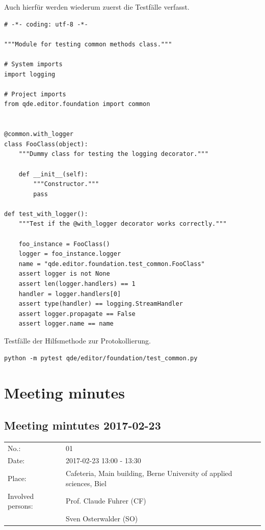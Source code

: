\documentclass[10pt, openright, notitlepage]{scrreprt}
\begin{document}
Auch hierfür werden wiederum zuerst die Testfälle verfasst.

\begin{listing}[H]
\begin{verbatim}
# -*- coding: utf-8 -*-

"""Module for testing common methods class."""

# System imports
import logging

# Project imports
from qde.editor.foundation import common


@common.with_logger
class FooClass(object):
    """Dummy class for testing the logging decorator."""

    def __init__(self):
        """Constructor."""
        pass

def test_with_logger():
    """Test if the @with_logger decorator works correctly."""

    foo_instance = FooClass()
    logger = foo_instance.logger
    name = "qde.editor.foundation.test_common.FooClass"
    assert logger is not None
    assert len(logger.handlers) == 1
    handler = logger.handlers[0]
    assert type(handler) == logging.StreamHandler
    assert logger.propagate == False
    assert logger.name == name
\end{verbatim}
\caption{\label{fig:editor-common-logging-test}
Testfälle der Hilfsmethode zur Protokollierung.}
\end{listing}

\begin{verbatim}
python -m pytest qde/editor/foundation/test_common.py
\end{verbatim}


\section{Meeting minutes}
\label{sec:org53120a9}

\subsection{Meeting mintutes 2017-02-23}
\label{sec:org28e57ae}

\begin{center}
\begin{tabular}{ll}
No.: & 01\\
Date: & 2017-02-23 13:00 - 13:30\\
Place: & Cafeteria, Main building, Berne University of applied sciences, Biel\\
Involved persons: & Prof. Claude Fuhrer (CF)\\
 & Sven Osterwalder (SO)\\
\end{tabular}
\end{center}
\end{document}
